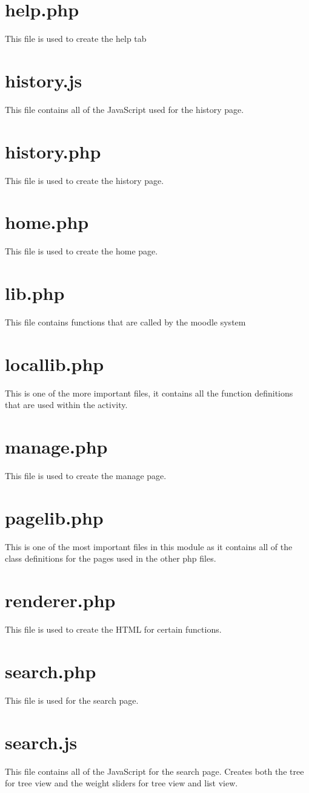 \documentclass[letterpaper,twoside,12pt]{report}
\begin{document}
	\section{help.php}
	This file is used to create the help tab
	\section{history.js}
	This file contains all of the JavaScript used for the history page.
	\section{history.php}
	This file is used to create the history page.
	\section{home.php}
	This file is used to create the home page.
	\section{lib.php}
	This file contains functions that are called by the moodle system
	\section{locallib.php}
	This is one of the more important files, it contains all the function definitions that are used within the activity.
	\section{manage.php}
	This file is used to create the manage page.
	\section{pagelib.php}
	This is one of the most important files in this module as it contains all of the class definitions for the pages used in the other php files.
	\section{renderer.php}	
	This file is used to create the HTML for certain functions.
	\section{search.php}
	This file is used for the search page.
	\section{search.js}
	This file contains all of the JavaScript for the search page. Creates both the tree for tree view and the weight sliders for tree view and list view.
\end{document}
